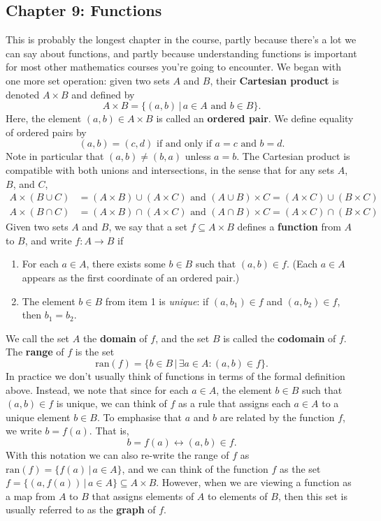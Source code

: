 \documentclass[letterpaper,12pt]{article}
\begin{document}
\subsection*{Chapter 9: Functions}
This is probably the longest chapter in the course, partly because there's a lot we can say about functions, and partly because understanding functions is important for most other mathematics courses you're going to encounter. We began with one more set operation: given two sets $A$ and $B$, their {\bf Cartesian product} is denoted $A\times B$ and defined by
\[
 A\times B = \{(a,b)\,|\, a\in A \text{ and } b\in B\}.
\]
Here, the element $(a,b)\in A\times B$ is called an {\bf ordered pair}. We define equality of ordered pairs by
\[
 (a,b) = (c,d) \text{ if and only if } a=c \text{ and } b=d.
\]
Note in particular that $(a,b)\neq (b,a)$ unless $a=b$. The Cartesian product is compatible with both unions and intersections, in the sense that for any sets $A$, $B$, and $C$,
\begin{align*}
 A\times (B\cup C) & = (A\times B)\cup (A\times C) \text{ and } (A\cup B)\times C = (A\times C)\cup (B\times C)\\
 A\times (B\cap C) & = (A\times B)\cap (A\times C) \text{ and } (A\cap B)\times C = (A\times C)\cap (B\times C)
\end{align*}
Given two sets $A$ and $B$, we say that a set $f\subseteq A\times B$ defines a {\bf function} from $A$ to $B$, and write $f:A\to B$ if
\begin{enumerate}
 \item For each $a\in A$, there exists some $b\in B$ such that $(a,b)\in f$. (Each $a\in A$ appears as the first coordinate of an ordered pair.)
 \item The element $b\in B$ from item 1 is {\em unique}: if $(a,b_1)\in f$ and $(a,b_2)\in f$, then $b_1=b_2$.
\end{enumerate}
We call the set $A$ the {\bf domain} of $f$, and the set $B$ is called the {\bf codomain} of $f$. The {\bf range} of $f$ is the set
\[
 \mathrm{ran}(f) = \{b\in B \,|\, \exists a\in A : (a,b)\in f\}.
\]
In practice we don't usually think of functions in terms of the formal definition above. Instead, we note that since for each $a\in A$, the element $b\in B$ such that $(a,b)\in f$ is unique, we can think of $f$ as a rule that assigns each $a\in A$ to a unique element $b\in B$. To emphasise that $a$ and $b$ are related by the function $f$, we write $b = f(a)$. That is,
\[
 b = f(a) \leftrightarrow (a,b)\in f.
\]
With this notation we can also re-write the range of $f$ as $\mathrm{ran}(f) = \{f(a) \,|\, a\in A\}$, and we can think of the function $f$ as the set $f = \{(a,f(a)) \,|\, a\in A\}\subseteq A\times B$. However, when we are viewing a function as a map from $A$ to $B$ that assigns elements of $A$ to elements of $B$, then this set is usually referred to as the {\bf graph} of $f$.
\end{document}
